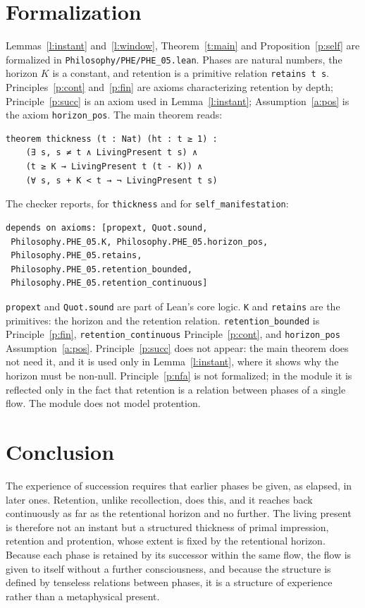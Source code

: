 \documentclass{situationist-preprint}
\begin{document}
\section{Formalization}\label{s:formal}

Lemmas~\ref{l:instant} and~\ref{l:window}, Theorem~\ref{t:main} and Proposition~\ref{p:self} are formalized in \nolinkurl{Philosophy/PHE/PHE_05.lean}. Phases are natural numbers, the horizon $K$ is a constant, and retention is a primitive relation \texttt{retains t s}. Principles~\ref{p:cont} and~\ref{p:fin} are axioms characterizing retention by depth; Principle~\ref{p:succ} is an axiom used in Lemma~\ref{l:instant}; Assumption~\ref{a:pos} is the axiom \texttt{horizon\_pos}. The main theorem reads:

\begin{lstlisting}
theorem thickness (t : Nat) (ht : t ≥ 1) :
    (∃ s, s ≠ t ∧ LivingPresent t s) ∧
    (t ≥ K → LivingPresent t (t - K)) ∧
    (∀ s, s + K < t → ¬ LivingPresent t s)
\end{lstlisting}

The checker reports, for \texttt{thickness} and for \texttt{self\_manifestation}:

\begin{lstlisting}
depends on axioms: [propext, Quot.sound,
 Philosophy.PHE_05.K, Philosophy.PHE_05.horizon_pos,
 Philosophy.PHE_05.retains,
 Philosophy.PHE_05.retention_bounded,
 Philosophy.PHE_05.retention_continuous]
\end{lstlisting}

\texttt{propext} and \texttt{Quot.sound} are part of Lean's core logic. \texttt{K} and \texttt{retains} are the primitives: the horizon and the retention relation. \texttt{retention\_bounded} is Principle~\ref{p:fin}, \texttt{retention\_continuous} Principle~\ref{p:cont}, and \texttt{horizon\_pos} Assumption~\ref{a:pos}. Principle~\ref{p:succ} does not appear: the main theorem does not need it, and it is used only in Lemma~\ref{l:instant}, where it shows why the horizon must be non-null. Principle~\ref{p:nfa} is not formalized; in the module it is reflected only in the fact that retention is a relation between phases of a single flow. The module does not model protention.

\section{Conclusion}

The experience of succession requires that earlier phases be given, as elapsed, in later ones. Retention, unlike recollection, does this, and it reaches back continuously as far as the retentional horizon and no further. The living present is therefore not an instant but a structured thickness of primal impression, retention and protention, whose extent is fixed by the retentional horizon. Because each phase is retained by its successor within the same flow, the flow is given to itself without a further consciousness, and because the structure is defined by tenseless relations between phases, it is a structure of experience rather than a metaphysical present.
\end{document}
